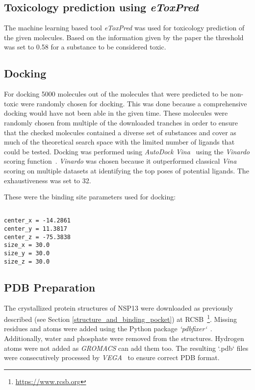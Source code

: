 \documentclass[11pt, letterpaper, titlepage]{article}
\begin{document}
\subsection{Toxicology prediction using \emph{eToxPred}}

The machine learning based tool \emph{eToxPred} \cite{Pu2019} was used for toxicology prediction of the given molecules. Based on the information given by the paper the threshold was set to 0.58 for a substance to be considered toxic.


\subsection{Docking}

For docking 5000 molecules out of the molecules that were predicted to be non-toxic were randomly chosen for docking. This was done because a comprehensive docking would have not been able in the given time. These molecules were randomly chosen from multiple of the downloaded tranches in order to ensure that the checked molecules contained a diverse set of substances and cover as much of the theoretical search space with the limited number of ligands that could be tested. Docking was performed using \emph{AutoDock Vina}~\cite{Forli2016} using the \emph{Vinardo} scoring function~\cite{Quiroga2016}. \emph{Vinardo} was chosen because it outperformed classical \emph{Vina} scoring on multiple datasets at identifying the top poses of potential ligands. The exhaustiveness was set to 32. \newline \newline

These were the binding site parameters used for docking: \newline \newline 

\begin{verbatim}

center_x = -14.2861
center_y = 11.3817
center_z = -75.3838
size_x = 30.0
size_y = 30.0
size_z = 30.0

\end{verbatim}

\subsection{PDB Preparation} 

The crystallized protein structures of NSP13 were downloaded as previously described (see Section \ref{structure_and_binding_pocket}) at RCSB~\footnote{\url{https://www.rcsb.org}}. Missing residues and atoms were added using the Python 
package \emph{`pdbfixer`}~\cite{Eastman2013OpenMM4A}. Additionally, water and phosphate were removed from the structures. Hydrogen atoms were not added as \emph{GROMACS} can add them too. The resulting `.pdb` files were consecutively processed by \emph{VEGA}~\cite{Pedretti2002VEGAAV} to ensure correct PDB format.  
\end{document}
